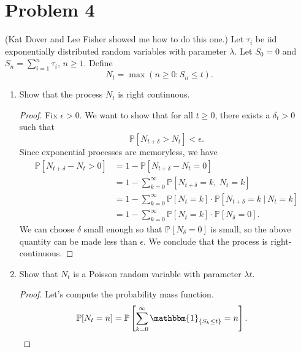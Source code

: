 \documentclass[11pt,letterpaper]{report}
\newcommand{\Prob}{\mathbb{P}}
\newcommand{\ind}{\mathbbm{1}}
\begin{document}
\section*{Problem 4}
(Kat Dover and Lee Fisher showed me how to do this one.) Let $\tau_i$ be iid exponentially distributed random variables with parameter $\lambda$. Let $S_0 = 0$ and $S_n = \sum_{i=1}^n\tau_i$, $n\geq 1$. Define
	\[
	N_t = \max(n\geq 0: S_n\leq t).
	\]
\begin{enumerate}[(a.)]
	\item Show that the process $N_t$ is right continuous.
	\begin{proof}
		Fix $\epsilon>0$. We want to show that for all $t\geq 0$, there exists a $\delta_t>0$ such that
		\[
		\Prob[N_{t+\delta}>N_t]<\epsilon.
		\]
		Since exponential processes are memoryless, we have
		\begin{align*}
			\Prob[N_{t+\delta}-N_t>0] &= 1-\Prob[N_{t+\delta}-N_t = 0]\\
			&= 1-\sum_{k=0}^\infty \Prob[N_{t+\delta}=k,\ N_t=k]\\
			&= 1-\sum_{k=0}^\infty\Prob[N_t=k]\cdot\Prob[N_{t+\delta}=k\ |\ N_t=k]\\
			&= 1-\sum_{k=0}^\infty\Prob[N_t=k]\cdot \Prob[N_\delta=0].
		\end{align*}
		We can choose $\delta$ small enough so that $\Prob[N_\delta=0]$ is small, so the above quantity can be made less than $\epsilon$. We conclude that the process is right-continuous.
	\end{proof}

	\item Show that $N_t$ is a Poisson random variable with parameter $\lambda t$.
	\begin{proof}
		Let's compute the probability mass function.
		\begin{align*}
			\Prob[N_t = n] &= \Prob\left[\sum_{k=0}^\infty\ind_{\{S_k\leq t\}} = n\right].
		\end{align*}
		
	\end{proof}
\end{enumerate}
\end{document}
